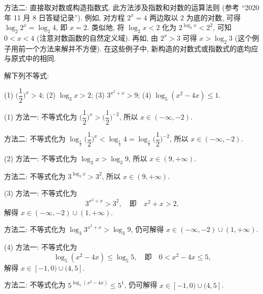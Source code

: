 方法二: 直接取对数或构造指数式. 此方法涉及指数和对数的运算法则 (参考 ``2020 年 11 月 8 日答疑记录''). 例如, 对方程 $2^x=4$ 两边取以 $2$ 为底的对数, 可得 $\log_2 2^x= \log_2 4$, 即 $x=2$. 类似地, 将 $\log_2 x< 2$ 化为 $2^{\log_2 x}< 2^2$, 可知 $0<x<4$ (注意对数函数的自然定义域). 再如, 由 $2^x>3$ 可得 $x>\log_2 3$ (这个例子用前一个方法来解并不方便). 在这些例子中, 新构造的对数式或指数式的底均应与原式中的相同.

\begin{example}
    解下列不等式: 
    
    (1) $\biggl(\dfrac12\biggr)^x>4$;\qquad
    (2) $\log_3 x> 2$;\qquad
    (3) $3^{x^2+x}>9$;\qquad
    (4) $\log_5 (x^2-4x)\leqslant 1$.
\end{example}
\begin{solution}
    (1) 方法一: 不等式化为 $\biggl(\dfrac12\biggr)^x> \biggl(\dfrac12\biggr)^{-2}$, 所以 $x\in(-\infty,-2)$.
    
    方法二: 不等式化为 $\log_{\frac12}\biggl(\dfrac12\biggr)^x< \log_{\frac12} 4= \log_{\frac12} \biggl(\dfrac12\biggr)^{-2}$, 所以 $x\in(-\infty,-2)$.
    
    (2) 方法一: 不等式化为 $\log_3 x> \log_3 9$, 所以 $x\in(9,+\infty)$.
    
    方法二: 不等式化为 $3^{\log_3 x}> 3^2$, 所以 $x\in(9,+\infty)$.
    
    (3) 方法一: 不等式化为 
    \[3^{x^2+x}>3^2,\quad\text{即}\quad x^2+x>2,\]
    解得 $x\in(-\infty,-2)\cup (1,+\infty)$.
    
    方法二: 不等式化为 $\log_3 3^{x^2+x}>\log_3 9$, 仍可解得 $x\in(-\infty,-2)\cup (1,+\infty)$.
    
    (4) 方法一: 不等式化为 
    \[\log_5 (x^2-4x)\leqslant \log_5 5,\quad\text{即}\quad 0<x^2-4x\leqslant 5,\]
    解得 $x\in[-1,0)\cup (4,5]$.
    
    方法二: 不等式化为 $5^{\log_5 (x^2-4x)}\leqslant 5^1$, 仍可解得 $x\in[-1,0)\cup (4,5]$.
\end{solution}